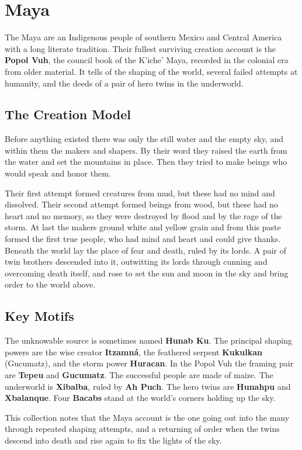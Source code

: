 \section{Maya}

The Maya are an Indigenous people of southern Mexico and Central America with a long literate tradition. Their fullest surviving creation account is the \textbf{Popol Vuh}, the council book of the K'iche' Maya, recorded in the colonial era from older material. It tells of the shaping of the world, several failed attempts at humanity, and the deeds of a pair of hero twins in the underworld.

\subsection{The Creation Model}

Before anything existed there was only the still water and the empty sky, and within them the makers and shapers. By their word they raised the earth from the water and set the mountains in place. Then they tried to make beings who would speak and honor them.

Their first attempt formed creatures from mud, but these had no mind and dissolved. Their second attempt formed beings from wood, but these had no heart and no memory, so they were destroyed by flood and by the rage of the storm. At last the makers ground white and yellow grain and from this paste formed the first true people, who had mind and heart and could give thanks. Beneath the world lay the place of fear and death, ruled by its lords. A pair of twin brothers descended into it, outwitting its lords through cunning and overcoming death itself, and rose to set the sun and moon in the sky and bring order to the world above.

\subsection{Key Motifs}

The unknowable source is sometimes named \textbf{Hunab Ku}. The principal shaping powers are the wise creator \textbf{Itzamn\'a}, the feathered serpent \textbf{Kukulkan} (Gucumatz), and the storm power \textbf{Huracan}. In the Popol Vuh the framing pair are \textbf{Tepeu} and \textbf{Gucumatz}. The successful people are made of maize. The underworld is \textbf{Xibalba}, ruled by \textbf{Ah Puch}. The hero twins are \textbf{Hunahpu} and \textbf{Xbalanque}. Four \textbf{Bacabs} stand at the world's corners holding up the sky.

This collection notes that the Maya account is the one going out into the many through repeated shaping attempts, and a returning of order when the twins descend into death and rise again to fix the lights of the sky.
